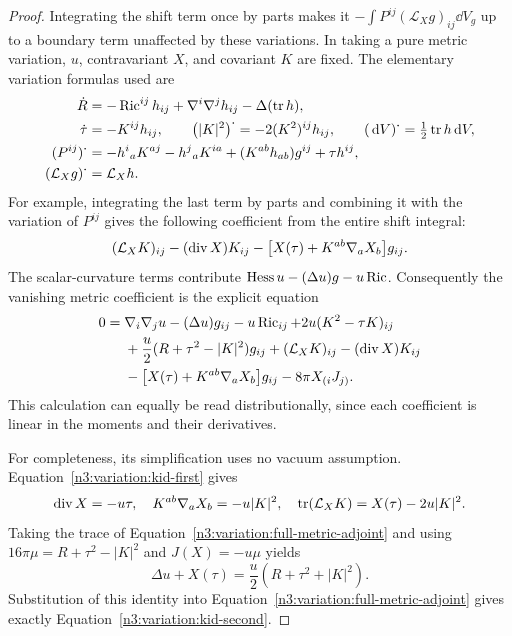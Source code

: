 \begin{proof}
Integrating the shift term once by parts makes it
$-\int P^{ij}(\mathcal L_Xg)_{ij}\dd V_g$ up to a boundary term
unaffected by these variations.  In taking a pure metric variation,
$u$, contravariant $X$, and covariant $K$ are fixed.  The elementary
variation formulas used are
\begin{align*}
 \dot R&=-\operatorname{Ric}^{ij}h_{ij}
             +\nabla^i\nabla^jh_{ij}-\Delta(\operatorname{tr} h),\\
 \dot\tau&=-K^{ij}h_{ij},\qquad
 \bigl(|K|^2\bigr)^{\boldsymbol\cdot}
       =-2(K^2)^{ij}h_{ij},\qquad
 (\,\mathrm d V)^{\boldsymbol\cdot}=\tfrac12\operatorname{tr} h\,\mathrm d V,\\
 (P^{ij})^{\boldsymbol\cdot}
       &=-h^i{}_aK^{aj}-h^j{}_aK^{ia}
                +(K^{ab}h_{ab})g^{ij}+\tau h^{ij},\\
 (\mathcal L_Xg)^{\boldsymbol\cdot}&=\mathcal L_Xh.
\end{align*}
For example, integrating the last term by parts and combining it
with the variation of $P^{ij}$ gives the following coefficient from
the entire shift integral:
\[
 (\mathcal L_XK)_{ij}-(\operatorname{div} X)K_{ij}
       -\bigl[X(\tau)+K^{ab}\nabla_aX_b\bigr]g_{ij}.
\]
The scalar-curvature terms contribute
$\operatorname{Hess} u-(\Delta u)g-u\operatorname{Ric}$.  Consequently the vanishing metric
coefficient is the explicit equation
\begin{equation}
 \begin{split}
 0={}&\nabla_i\nabla_j u-(\Delta u)g_{ij}-u\operatorname{Ric}_{ij}
       +2u(K^2-\tau K)_{ij}\\
   &+\frac u2(R+\tau^2-|K|^2)g_{ij}
       +(\mathcal L_XK)_{ij}-(\operatorname{div} X)K_{ij}\\
   &-\bigl[X(\tau)+K^{ab}\nabla_aX_b\bigr]g_{ij}
       -8\pi X_{(i}J_{j)}.
 \end{split}
 \label{n3:variation:full-metric-adjoint}
\end{equation}
This calculation can equally be read distributionally, since each
coefficient is linear in the moments and their derivatives.

For completeness, its simplification uses no vacuum assumption.
Equation~\eqref{n3:variation:kid-first} gives
\[
 \operatorname{div} X=-u\tau,\quad
 K^{ab}\nabla_aX_b=-u|K|^2,\quad
 \operatorname{tr}(\mathcal L_XK)=X(\tau)-2u|K|^2.
\]
Taking the trace of Equation~\eqref{n3:variation:full-metric-adjoint}
and using
$16\pi\mu=R+\tau^2-|K|^2$ and $J(X)=-u\mu$ yields
\begin{equation}
 \Delta u+X(\tau)=\frac u2(R+\tau^2+|K|^2).
 \label{n3:variation:trace-metric-equation}
\end{equation}
Substitution of this identity into
Equation~\eqref{n3:variation:full-metric-adjoint} gives exactly
Equation~\eqref{n3:variation:kid-second}.


\end{proof}
